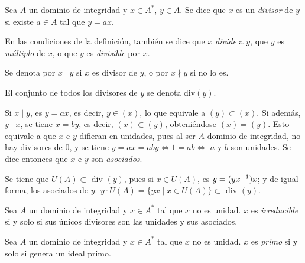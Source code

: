 
 
\begin{deff}[Divisor]{\cite[p.~35]{GamboaAnillos}}
    Sea $A$ un dominio de integridad y $x\in A^*$, $y\in A$. Se dice que $x$ es un \textit{divisor} de $y$ si existe $a\in A$ tal que $y = ax$.
\end{deff}

\begin{nott}
    \item En las condiciones de la definición, también se dice que $x$ \textit{divide} a $y$, que $y$ es \textit{múltiplo} de $x$, o que $y$ es \textit{divisible} por $x$.
    \item Se denota por $x\mid y$ si $x$ es divisor de $y$, o por $x\nmid y$ si no lo es.
    \item El conjunto de todos los divisores de $y$ se denota div$(y)$.
\end{nott}

\begin{obss}
    \item Si $x\mid y$, es $y = ax$, es decir, $y \in (x)$, lo que equivale a $(y) \subset (x)$. Si además, $y\mid x$, se tiene $x = by$, es decir, $(x) \subset (y)$, obteniéndose $(x) = (y)$. Esto equivale a que $x$ e $y$ difieran en unidades, pues al ser $A$ dominio de integridad, no hay divisores de 0, y se tiene $y = ax = aby \iff 1 = ab \iff$ $a$ y $b$ son unidades. Se dice entonces que $x$ e $y$ son \textit{asociados}. \cite[p. ~37]{Rosenberger}
    \item Se tiene que $U(A)\subset \text{ div } (y)$, pues si $x\in U(A)$, es $y = (yx^{-1})x$; y de igual forma, los asociados de $y: \ y\cdot U(A) = \{yx\mid x \in U(A)\} \subset \text{ div } (y)$.           
\end{obss}

\begin{deff}{\cite[p.~36]{GamboaAnillos}}
    Sea $A$ un dominio de integridad y $x\in A^*$ tal que $x$ no es unidad. $x$ es \textit{irreducible} si y solo si sus únicos divisores son las unidades y sus asociados.
\end{deff}

\begin{deff}{\cite[p.~36]{GamboaAnillos}}
    Sea $A$ un dominio de integridad y $x\in A^*$ tal que $x$ no es unidad. $x$ es \textit{primo} si y solo si genera un ideal primo.
\end{deff}

